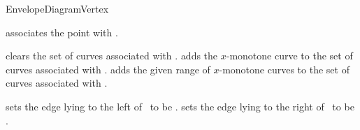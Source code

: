 \begin{ccRefConcept}{EnvelopeDiagramVertex}
\ccModifiers

    {associates the point  with \ccVar.}

    {clears the set of curves associated with \ccVar.}
\ccGlue
{}
    {adds the $x$-monotone curve  to the set of curves associated with \ccVar.}
\ccGlue
{}
    {adds the given range of $x$-monotone curves to the set of curves associated with \ccVar.}

    {sets the edge lying to the left of \ccVar\ to be .}
\ccGlue
{}
    {sets the edge lying to the right of \ccVar\ to be .}

\ccSeeAlso
     \\
     \\

\end{ccRefConcept}

\ccRefPageEnd

